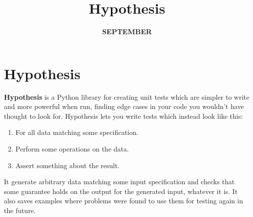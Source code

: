 \documentclass[]{article}
\title{{\textbf{Hypothesis}}}
\author{{\textbf {SEPTEMBER}}}
\begin{document}
\maketitle

\section{{\large Hypothesis}}
{\textbf {Hypothesis}} is a Python library for creating unit tests which are simpler to write and more powerful when run, finding edge cases in your code you wouldn’t have thought to look for. 
Hypothesis lets you write tests which instead look like this: 
\begin{enumerate}
	\item For all data matching some specification. 
	\item Perform some operations on the data.  
	\item Assert something about the result.
\end{enumerate}
It generate arbitrary data matching some input specification and checks that some guarantee holds on the output for the generated input, whatever it is. It also saves examples where problems were found to use them for testing again in the future.
 
\end{document}
